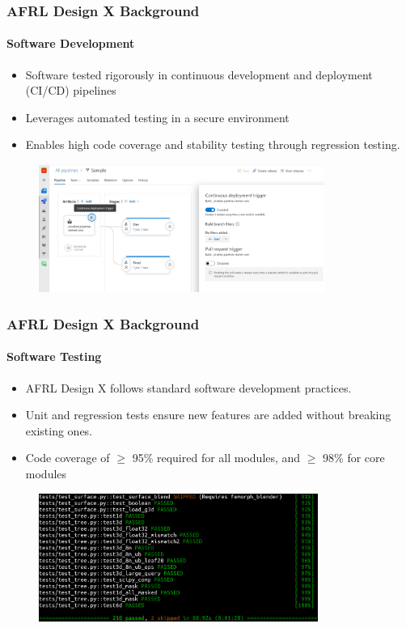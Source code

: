 \documentclass[t]{beamer}
\begin{document}
\begin{frame}
  \frametitle{AFRL Design X Background}
  \framesubtitle{Software Development}

  \begin{itemize}
  \item Software tested rigorously in continuous development and deployment (CI/CD) pipelines
  \item Leverages automated testing in a secure environment
  \item Enables high code coverage and stability testing through regression testing.
  \end{itemize}

      \begin{figure}
       \includegraphics[height=1.65in]{./figures/ci-trigger.png}
      \end{figure}

\end{frame}



\begin{frame}
  \frametitle{AFRL Design X Background}
  \framesubtitle{Software Testing}

  \begin{itemize}
  \item AFRL Design X follows standard software development practices.
  \item Unit and regression tests ensure new features are added without breaking existing ones.
  \item Code coverage of $\geq$ 95\% required for all modules, and $\geq$ 98\% for core modules
  \end{itemize}

      \begin{figure}
       \includegraphics[height=1.65in]{./figures/pytest.png}
      \end{figure}

\end{frame}
\end{document}
